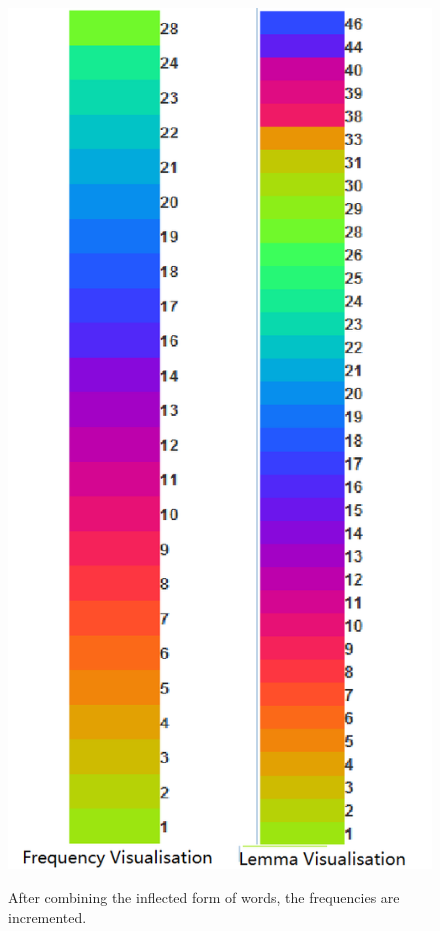 \begin{figure}[H]
	\centering	
	\includegraphics[scale=0.4]{Figs/Freq-Lemma-Comparison}\\[1ex]
	\caption{After combining the inflected form of words, the frequencies are incremented.} 
	\label{fig:freqLemmaComp}
\end{figure} 

